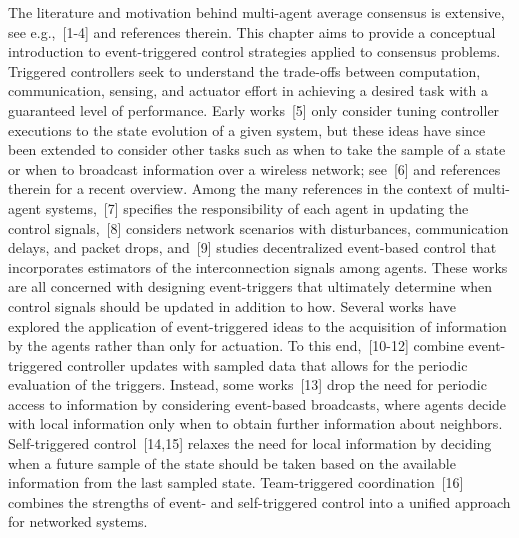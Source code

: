 \documentclass[]{book}
\begin{document}
The literature and motivation behind multi-agent average consensus is
extensive, see e.g.,~[1-4] and
references therein. This chapter aims to provide a conceptual
introduction to event-triggered control strategies applied to
consensus problems. Triggered controllers seek to understand the
trade-offs between computation, communication, sensing, and actuator
effort in achieving a desired task with a guaranteed level of
performance.  Early works~[5] only consider tuning
controller executions to the state evolution of a given system, but
these ideas have since been extended to consider other
tasks such as when to take the sample of a state or when to broadcast
information over a wireless network;
see~[6] and references therein for a recent
overview.  Among the many references in the context of multi-agent
systems,~[7] specifies the responsibility of each agent
in updating the control signals,~[8] considers network
scenarios with disturbances, communication delays, and packet drops,
and~[9] studies decentralized event-based control that
incorporates estimators of the interconnection signals among agents.
These works are all concerned with designing event-triggers that ultimately determine
when control signals should be updated in addition to how. 
Several works have explored the application of event-triggered ideas
to the acquisition of information by the agents rather than only for actuation.
To this end,~[10-12] combine
event-triggered controller updates with sampled data that allows for
the periodic evaluation of the triggers. Instead, some works~[13] drop the
need for periodic access to information by considering event-based
broadcasts, where agents decide with local information only when to
obtain further information about neighbors. Self-triggered
control~[14,15] relaxes the need for local
information by deciding when a future sample of the state should be
taken based on the available information from the last sampled
state. Team-triggered coordination~[16] combines the
strengths of event- and self-triggered control into a unified approach
for networked systems.
\end{document}
